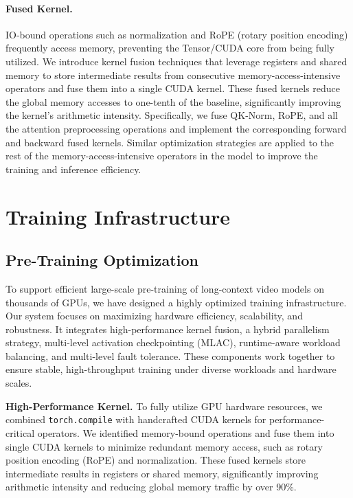 \paragraph{Fused Kernel.}
IO-bound operations such as normalization and RoPE (rotary position encoding) frequently access memory, preventing the Tensor/CUDA core from being fully utilized. 
We introduce kernel fusion techniques that leverage registers and shared memory to store intermediate results from consecutive memory-access-intensive operators and fuse them into a single CUDA kernel. These fused kernels reduce the global memory accesses to one-tenth of the baseline, significantly improving the kernel's arithmetic intensity. Specifically, we fuse QK-Norm, RoPE, and all the attention preprocessing operations and implement the corresponding forward and backward fused kernels. Similar optimization strategies are applied to the rest of the memory-access-intensive operators in the model to improve the training and inference efficiency.

\fi

\section{Training Infrastructure}
\subsection{Pre-Training Optimization}
To support efficient large-scale pre-training of long-context video models on thousands of GPUs, we have designed a highly optimized training infrastructure.
Our system focuses on maximizing hardware efficiency, scalability, and robustness. It integrates high-performance kernel fusion, a hybrid parallelism strategy, multi-level activation checkpointing (MLAC), runtime-aware workload balancing, and multi-level fault tolerance. These components work together to ensure stable, high-throughput training under diverse workloads and hardware scales.

\textbf{High-Performance Kernel.}
To fully utilize GPU hardware resources, we combined \texttt{torch.compile} with handcrafted CUDA kernels for performance-critical operators. We identified memory-bound operations and fuse them into single CUDA kernels to minimize redundant memory access, such as rotary position encoding (RoPE) and normalization. These fused kernels store intermediate results in registers or shared memory, significantly improving arithmetic intensity and reducing global memory traffic by over 90\%. 


